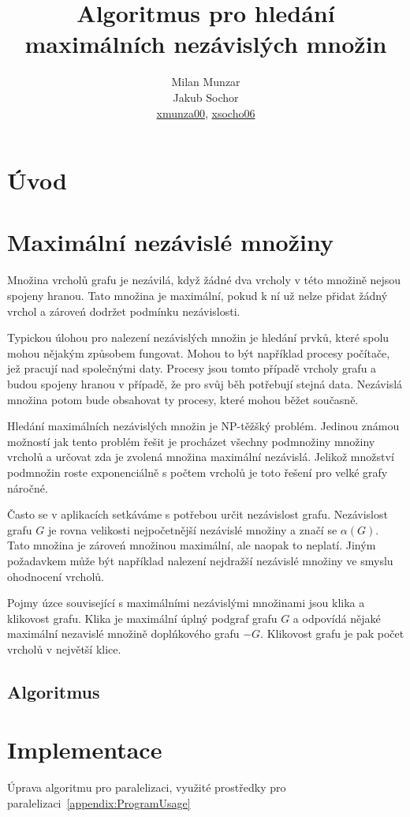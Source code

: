 \documentclass[12pt]{article}
\title{Algoritmus pro hledání maximálních nezávislých množin}
\author{Milan Munzar\\
Jakub Sochor\\
\normalsize{\url{xmunza00}, \url{xsocho06} }}
\date{}
\begin{document}
\maketitle

\section{Úvod}

\section{Maximální nezávislé množiny}

Množina vrcholů grafu je nezávilá, když žádné dva vrcholy v této množině nejsou spojeny hranou. Tato množina je maximální, pokud k ní už nelze přidat žádný vrchol a zároveń dodržet podmínku nezávislosti.

Typickou úlohou pro nalezení nezávislých množin je hledání prvků, které spolu mohou nějakým způsobem fungovat. Mohou to být například procesy počítače, jež pracují nad společnými daty. Procesy jsou tomto případě vrcholy grafu a budou spojeny hranou v případě, že pro svůj běh potřebují stejná data. Nezávislá množina potom bude obsahovat ty procesy, které mohou běžet současně.

Hledání maximálních nezávislých množin je NP-těžšký problém. Jedinou známou možností jak tento problém řešit je procházet všechny podmnožiny množiny vrcholů a určovat zda je zvolená množina maximální nezávislá. Jelikož množství podmnožin roste exponenciálně s počtem vrcholů je toto řešení pro velké grafy náročné.

Často se v aplikacích  setkáváme s potřebou určit nezávislost grafu. Nezávislost grafu \(G\) je rovna velikosti nejpočetnější nezávislé množiny a značí se \(\alpha(G)\). Tato množina je zároveń množinou maximální, ale naopak to neplatí. Jiným požadavkem může být například nalezení nejdražší nezávislé množiny ve smyslu ohodnocení vrcholů.

Pojmy úzce související s maximálními nezávislými množinami jsou klika a klikovost grafu. Klika je maximální úplný podgraf grafu \(G\) a odpovídá nějaké maximální nezavislé množině doplńkového grafu \(-G\). Klikovost grafu je pak počet vrcholů v největší klice.

\subsection{Algoritmus}


\section{Implementace}
Úprava algoritmu pro paralelizaci, využité prostředky pro paralelizaci~\ref{appendix:ProgramUsage}
\end{document}
